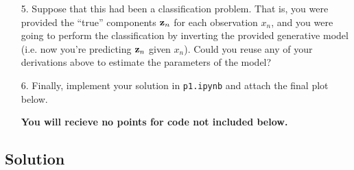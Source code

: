 \documentclass[submit]{harvardml}
\begin{document}
\begin{framed}
\begin{enumerate}
\item[5.] Suppose that this had been a classification problem. That is,
  you were provided the ``true'' components $\mathbf{z}_n$ for each
  observation $x_n$,
  and you were going to perform the classification by
  inverting the provided generative model (i.e. now you're predicting $\mathbf{z}_n$ given $x_n$). Could you reuse any of
  your derivations above to estimate the parameters of the model?
  

\item[6.] Finally, implement your solution in \texttt{p1.ipynb} and attach the final plot below.

{\bfseries You will recieve no points for code not included below.}
\end{enumerate}
  
\end{framed}

\newpage
\subsection*{Solution}
\end{document}
